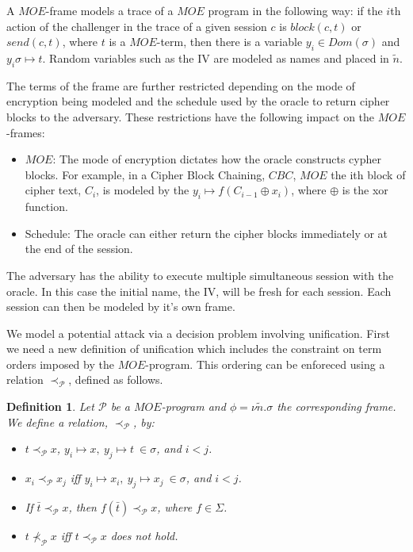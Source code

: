 \documentclass{easychair}
\newtheorem{definition}{Definition}
\begin{document}
A $MOE$-frame models a trace of a $MOE$ program in the following way:
if the $i$th action of the challenger in the trace of a given session $c$ is 
$block(c, t)$ or $send(c, t)$, where $t$ is a $MOE$-term, 
then there is a variable $y_i \in Dom(\sigma)$ and 
$y_i \sigma \mapsto t$. Random variables such as the IV are 
modeled as names and placed in $\tilde{n}$.

The terms of the frame are further restricted depending on the mode of encryption being modeled and the schedule used by the oracle to
return cipher blocks to the adversary. These restrictions have
the following impact on the $MOE$-frames:
\begin{itemize}
	\item $MOE$: The mode of encryption dictates how the oracle 
	constructs cypher blocks. For example, in a Cipher Block Chaining,
	$CBC$, $MOE$ the ith block of cipher text, $C_i$, is modeled by
	the $y_i \mapsto f(C_{i-1} \oplus x_i)$, where $\oplus$ is
	the xor function.
	\item Schedule: The oracle can either return the 
	cipher blocks immediately or at the end of the session.  
\end{itemize}

The adversary has the ability to execute multiple simultaneous session with the oracle. In this case the initial name, the IV, will be fresh for each session. Each session can then be modeled by it's own frame. 




We model a potential attack via a decision problem involving unification. First we need a new definition of unification which includes the 
constraint on term orders imposed by the $MOE$-program. This 
ordering can be enforeced using a relation $\prec_{\mathcal{P}}$, defined 
as follows. 

\begin{definition}
	Let $\mathcal{P}$ be a $MOE$-program and $\phi = \nu \tilde{n}.\sigma$ the corresponding frame. We define a relation, 
	$\prec_{\mathcal{P}}$, by:
	\begin{itemize}
		\item $t \prec_{\mathcal{P}} x$,
		$y_i \mapsto x, ~y_j \mapsto t ~ \in \sigma$, and
		$ i < j$.
		\item $x_i \prec_{\mathcal{P}} x_j$ iff 
		 $y_i \mapsto x_i, ~y_j \mapsto x_j ~ \in \sigma$, and
		 $ i < j$.
		 \item If $\bar{t} \prec_{\mathcal{P}} x$, then 
		 $f(\bar{t}) \prec_{\mathcal{P}} x$, where $f \in \Sigma$.
		 \item $t \not \prec_{\mathcal{P}} x$ iff $t \prec_{\mathcal{P}} x$ does not hold.
	\end{itemize}
\end{definition}
\end{document}

